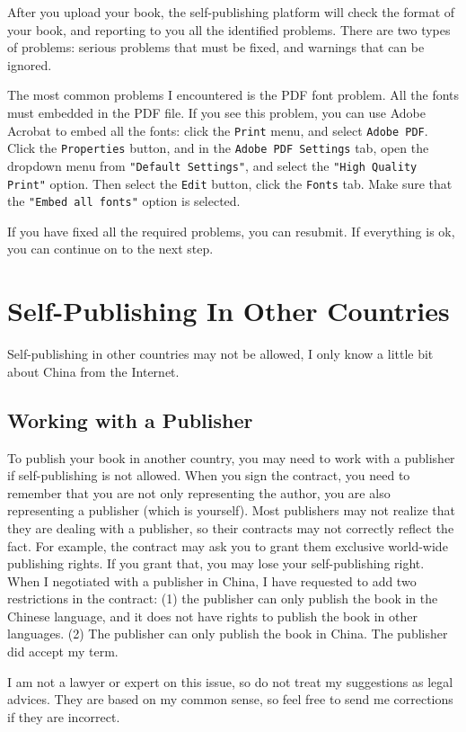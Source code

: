 After you upload your book, the self-publishing platform will check the format of your book,
and reporting to you all the identified problems. There are two types of problems: serious
problems that must be fixed, and warnings that can be ignored. 


The most common problems I encountered is the PDF font problem. All the fonts must embedded in
the PDF file. If you see this problem, you can use Adobe Acrobat to embed all the fonts: click
the \texttt{Print} menu, and select \texttt{Adobe PDF}. Click the \texttt{Properties} button,
and in the \texttt{Adobe PDF Settings} tab, open the dropdown menu from
\texttt{"Default Settings"}, and select the \texttt{"High Quality Print"} option.
Then select the \texttt{Edit} button, click the \texttt{Fonts} tab. Make sure that 
the \texttt{"Embed all fonts"} option is selected.  


If you have fixed all the required problems, you can resubmit. If everything is ok, you can
continue on to the next step. 




\section{Self-Publishing In Other Countries}

Self-publishing in other countries may not be allowed, 
I only know a little bit about China from the Internet.



\subsection{Working with a Publisher}

To publish your book in another country, you may need to work
with a publisher if self-publishing is not allowed. When you sign
the contract, you need to remember that you are not only representing the author, 
you are also representing a
publisher (which is yourself). Most publishers may not realize that they 
are dealing with a publisher, so their contracts may not correctly reflect the fact. 
For example, the contract may ask you to grant them exclusive world-wide publishing rights. 
If you grant that, you may lose your self-publishing right.  
When I negotiated with a publisher in China, I have requested to add two restrictions in the 
contract: (1) the publisher can only publish the book in the Chinese language, 
and it does not have rights to publish the book in other languages. 
(2) The publisher can only publish the book in China. 
The publisher did accept my term. 


I am not a lawyer or expert on this issue, so do not treat my suggestions as 
legal advices. They are based on my common sense, so 
feel free to send me corrections if they are incorrect. 





